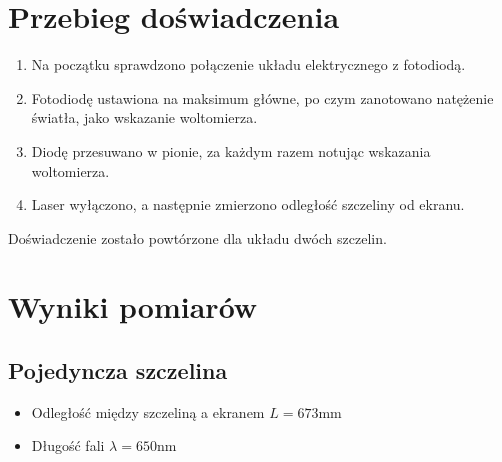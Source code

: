 \documentclass{fizykalab}
\begin{document}
\section{Przebieg doświadczenia}
\begin{enumerate}
    \item Na początku sprawdzono połączenie układu elektrycznego z fotodiodą.
    \item Fotodiodę ustawiona na maksimum główne, po czym zanotowano natężenie światła, jako wskazanie woltomierza.
    \item Diodę przesuwano w pionie, za każdym razem notując wskazania woltomierza.
    \item Laser wyłączono, a następnie zmierzono odległość szczeliny od ekranu.
\end{enumerate}
Doświadczenie zostało powtórzone dla układu dwóch szczelin.

\section{Wyniki pomiarów}

\subsection{Pojedyncza szczelina}

\begin{itemize}
    \item Odległość między szczeliną a ekranem $L = 673 \text{mm}$
    \item Długość fali $\lambda = 650 \text{nm}$
\end{itemize}
\end{document}
